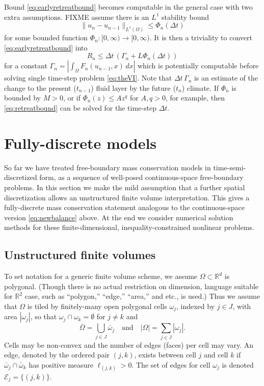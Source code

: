\documentclass[final,leqno,onefignum,onetabnum]{siamltex1213bueler}
\newcommand\RR{\mathbb{R}}
\begin{document}
Bound \eqref{eq:earlyretreatbound} becomes computable in the general case with two extra assumptions.  FIXME assume there is an $L^1$ stability bound
\begin{equation}
\|u_n-u_{n-1}\|_{L^1(\Omega)} \le \Phi_n(\Delta t)
\end{equation}
for some bounded function $\Phi_n : [0,\infty) \to [0,\infty)$.  It is then a triviality to convert \eqref{eq:earlyretreatbound} into
\begin{equation}
R_n \le \Delta t\,\left(\Gamma_n + L \Phi_n(\Delta t)\right)   \label{eq:retreatbound}
\end{equation}
for a constant $\Gamma_n=\left|\int_{\Omega} F_n(u_{n-1},x)\,dx\right|$ which is potentially computable before solving single time-step problem \eqref{eq:theVI}.  Note that $\Delta t\,\Gamma_n$ is an estimate of the change to the present ($t_{n-1}$) fluid layer by the future ($t_n$) climate.  If $\Phi_n$ is bounded by $M>0$, or if $\Phi_n(z) \le A z^q$ for $A,q>0$, for example, then \eqref{eq:retreatbound} can be solved for the time-step $\Delta t$.


\section{Fully-discrete models}  \label{sec:spacediscretized}

So far we have treated free-boundary mass conservation models in time-semi-discretized form, as a sequence of well-posed continuous-space free-boundary problems.  In this section we make the mild assumption that a further spatial discretization allows an unstructured finite volume \cite{LeVeque2002} interpretation.  This gives a fully-discrete mass conservation statement analogous to the continuous-space version \eqref{eq:newbalance} above.  At the end we consider numerical solution methods for these finite-dimensional, inequality-constrained nonlinear problems.

\subsection{Unstructured finite volumes} \label{subsec:spacenotation}  To set notation for a generic finite volume scheme, we assume $\Omega \subset \RR^d$ is polygonal.  (Though there is no actual restriction on dimension, language suitable for $\RR^2$ case, such as ``polygon,'' ``edge,'' ``area,'' and etc., is used.)  Thus we assume that $\Omega$ is tiled by finitely-many open polygonal cells $\omega_j$, indexed by $j\in J$, with area $|\omega_j|$, so that $\omega_j \cap \omega_k = \emptyset$ for $j\ne k$ and
\begin{equation}
\bar\Omega = \bigcup_{j\in J} \bar \omega_j \quad \text{and} \quad |\Omega| = \sum_{j\in J} |\omega_j|.  \label{eq:tiling}
\end{equation}
Cells may be non-convex and the number of edges (faces) per cell may vary.  An edge, denoted by the ordered pair $(j,k)$, exists between cell $j$ and cell $k$ if $\bar\omega_j \cap \bar \omega_k$ has positive measure $\ell_{(j,k)}>0$.  The set of edges for cell $\omega_j$ is denoted $\mathcal{E}_j=\{(j,k)\}$.
\end{document}
